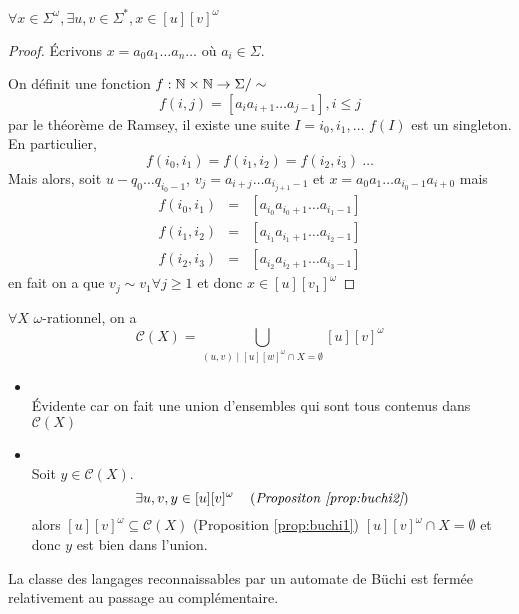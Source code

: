 \begin{prop}\label{prop:buchi2}
	$\forall x \in \Sigma^{\omega}, \exists u,v \in \Sigma^*, x \in [u][v]^{\omega}$
\end{prop}


\begin{proof}
	Écrivons $x = a_0a_1 \ldots a_n \ldots$ où $a_i \in \Sigma$.

	On définit une fonction $f : \mathbb{N} \times \mathbb{N} \to \Sigma/\sim$
	$$f(i,j) = [a_ia_{i+1}\ldots a_{j-1}], i \leq j$$
	par le théorème de Ramsey, il existe une suite $I = i_0,i_1,\ldots$ \tlq $f(I)$ est un singleton.
	En particulier,
	$$f(i_0,i_1) = f(i_1,i_2) = f(i_2,i_3) \ \ldots$$
	Mais alors, soit $u - q_0 \ldots q_{i_0-1}$, $v_j = a_{i+j} \ldots a_{{i_{j+1} -1}}$ et $x = a_0a_ 1\ldots a_{i_0-1}a_{i+0}$
	mais
	\begin{eqnarray*}
		f(i_0,i_1) &=& [a_{i_0} a_{i_0+1}\ldots a_{i_1-1}] \\
		f(i_1,i_2) &=& [a_{i_1} a_{i_1+1}\ldots a_{i_2-1}] \\
		f(i_2,i_3) &=& [a_{i_2} a_{i_2+1}\ldots a_{i_3-1}]
	\end{eqnarray*}
	en fait on a que $v_j \sim v_1 \forall j \geq 1$ et donc $x \in [u][v_1]^{\omega}$
\end{proof}

\begin{theorem}
	$\forall X$ $\omega$-rationnel, on a
	$$ \mathcal{C}(X) = \bigcup_{(u,v) \mid [u][w]^{\omega} \cap X = \emptyset} [u][v]^{\omega}$$
\end{theorem}

\begin{proofI}
	\begin{itemize}
		\item \fbox{$\supseteq$} \\
		      Évidente car on fait une union d'ensembles qui sont tous contenus dans $\mathcal C (X)$
		\item \fbox{$\subseteq$} \\
		      Soit $y \in \mathcal C (X)$.
		      $$\exists u,v, y \in [u][v]^{\omega} \quad\left(\textit{Propositon \ref{prop:buchi2}}\right)$$
		      alors $[u][v]^{\omega} \subseteq \mathcal C (X)$ (Proposition \ref{prop:buchi1})
		      \cad $[u][v]^{\omega} \cap X = \emptyset$ et donc $y$ est bien dans l'union.
	\end{itemize}
\end{proofI}

\begin{coro}
	La classe des langages reconnaissables par un automate de Büchi est fermée relativement au passage au complémentaire.
\end{coro}


